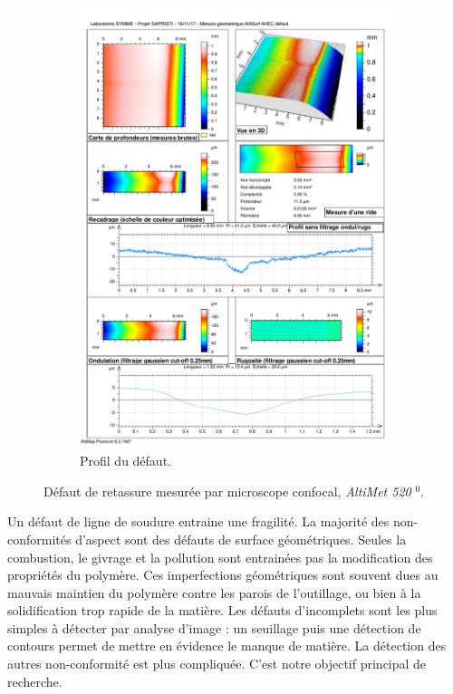 \begin{figure}[tbhp!]
\begin{subfigure}[c]{\textwidth}
		\includegraphics[width=\textwidth]{../Chap2/Figures/altisurf_defect_profil.pdf}
		\caption{Profil du défaut.}
	\end{subfigure}%
	\caption{Défaut de retassure mesurée par microscope confocal, \textit{AltiMet 520} $^0$.}
	\label{fig:confocal_defect}
\end{figure}
{}

Un défaut de ligne de soudure entraine une fragilité.
La majorité des non-conformités d'aspect sont des défauts de surface géométriques.
Seules la combustion, le givrage et la pollution sont entrainées pas la modification des propriétés du polymère.
Ces imperfections géométriques sont souvent dues au mauvais maintien du polymère contre les parois de l'outillage, ou bien à la solidification trop rapide de la matière.
Les défauts d'incomplets sont les plus simples à détecter par analyse d'image : un seuillage puis une détection de contours permet de mettre en évidence le manque de matière.
La détection des autres non-conformité est plus compliquée.
C'est notre objectif principal de recherche.

